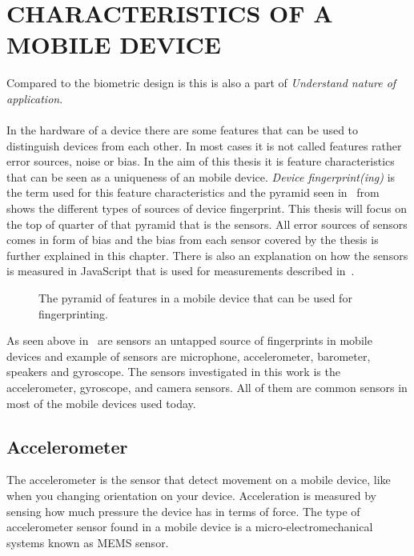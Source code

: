 \chapter{CHARACTERISTICS OF A MOBILE DEVICE} \label{cha:character}
Compared to the biometric design is this is also a part of \textit{Understand nature of application}.\\
\\
In the hardware of a device there are some features that can be used to distinguish devices from each other. In most cases it is not called features rather error sources, noise or bias. In the aim of this thesis it is feature characteristics that can be seen as a uniqueness of an mobile device. \textit{Device fingerprint(ing)} is the term used for this feature characteristics and the pyramid seen in~ from ~\cite[]{sensor:acoustic} shows the different types of sources of device fingerprint. This thesis will focus on the top of quarter of that pyramid that is the sensors. All error sources of sensors comes in form of bias and the bias from each sensor covered by the thesis is further explained in this chapter. There is also an explanation on how the sensors is measured in JavaScript that is used for measurements described in~. \\


\begin{figure}[!h]
	
	\caption{\label{fig:pyramid} The pyramid of features in a mobile device that can be used for fingerprinting.\cite[]{sensor:acoustic}}
\end{figure}

As seen above in~ are sensors an untapped source of fingerprints in mobile devices and example of sensors are microphone, accelerometer, barometer, speakers and gyroscope. The sensors investigated in this work is the accelerometer, gyroscope, and camera sensors. All of them are common sensors in most of the mobile devices used today.


\section{Accelerometer}\label{sec:accelerometer}
The accelerometer is the sensor that detect movement on a mobile device, like when you changing orientation on your device. Acceleration is measured by sensing how much pressure the device has in terms of force. The type of accelerometer sensor found in a mobile device is a micro-electromechanical systems known as MEMS sensor. \cite[]{sensors:fusion}
